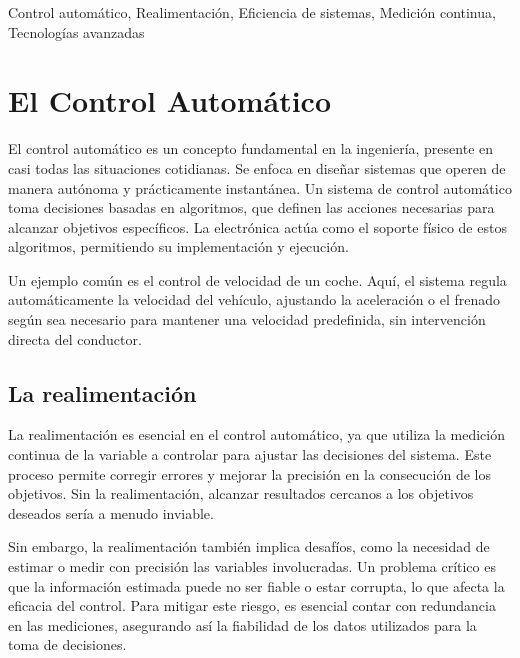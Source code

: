 \documentclass[journal, table]{IEEEtran}
\begin{document}
\begin{IEEEkeywords}

Control automático, Realimentación, Eficiencia de sistemas, Medición continua,
Tecnologías avanzadas

\end{IEEEkeywords}

\tableofcontents

\section{El Control Automático}%
\label{sec:El Control Automático}

El control automático es un concepto fundamental en la ingeniería, presente en
casi todas las situaciones cotidianas. Se enfoca en diseñar sistemas que operen
de manera autónoma y prácticamente instantánea. Un sistema de control automático
toma decisiones basadas en algoritmos, que definen las acciones necesarias para
alcanzar objetivos específicos.
La electrónica actúa como el soporte físico de estos algoritmos, permitiendo su
implementación y ejecución.

Un ejemplo común es el control de velocidad de un coche. Aquí, el sistema regula
automáticamente la velocidad del vehículo, ajustando la aceleración o el frenado
según sea necesario para mantener una velocidad predefinida, sin intervención
directa del conductor.

\subsection{La realimentación}%
\label{sub: realimentación}

La realimentación es esencial en el control automático, ya que utiliza la
medición continua de la variable a controlar para ajustar las decisiones del
sistema. Este proceso permite corregir errores y mejorar la precisión en la
consecución de los objetivos. Sin la realimentación, alcanzar resultados
cercanos a los objetivos deseados sería a menudo inviable.

Sin embargo, la realimentación también implica desafíos, como la necesidad de
estimar o medir con precisión las variables involucradas.
Un problema crítico es que la información estimada puede no ser fiable o estar
corrupta, lo que afecta la eficacia del control.
Para mitigar este riesgo, es esencial contar con redundancia en las mediciones,
asegurando así la fiabilidad de los datos utilizados para la toma de decisiones.
\end{document}
